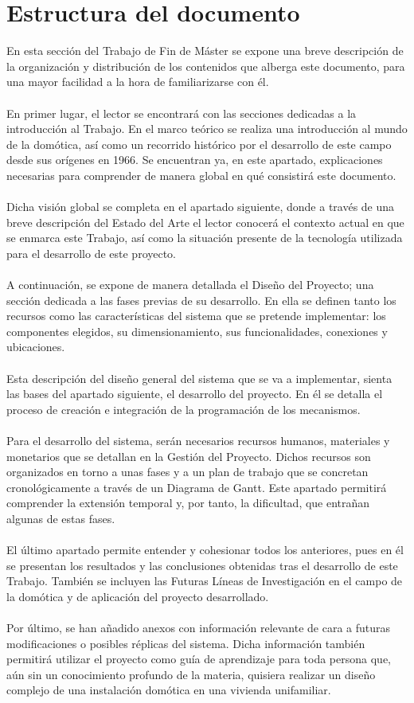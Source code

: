 \section{Estructura del documento}

En esta sección del Trabajo de Fin de Máster se expone una breve descripción de la organización y distribución de los contenidos que alberga este documento, para una mayor facilidad a la hora de familiarizarse con él.\\\\
En primer lugar, el lector se encontrará con las secciones dedicadas a la introducción al Trabajo. En el marco teórico se realiza una introducción al mundo de la domótica, así como un recorrido histórico por el desarrollo de este campo desde sus orígenes en 1966. Se encuentran ya, en este apartado, explicaciones necesarias para comprender de manera global en qué consistirá este documento. \\\\
Dicha visión global se completa en el apartado siguiente, donde a través de una breve descripción del Estado del Arte el lector conocerá el contexto actual en que se enmarca este Trabajo, así como la situación presente de la tecnología utilizada para el desarrollo de este proyecto.\\\\
A continuación, se expone de manera detallada el Diseño del Proyecto; una sección dedicada a las fases previas de su desarrollo. En ella se definen tanto los recursos como las características del sistema que se pretende implementar: los componentes elegidos, su dimensionamiento, sus funcionalidades, conexiones y ubicaciones.\\\\
Esta descripción del diseño general del sistema que se va a implementar, sienta las bases del apartado siguiente, el desarrollo del proyecto. En él se detalla el proceso de creación e integración de la programación de los mecanismos. \\\\
Para el desarrollo del sistema, serán necesarios recursos humanos, materiales y monetarios que se detallan en la Gestión del Proyecto. Dichos recursos son organizados en torno a unas fases y a un plan de trabajo que se concretan cronológicamente a través de un Diagrama de Gantt. Este apartado permitirá comprender la extensión temporal y, por tanto, la dificultad, que entrañan algunas de estas fases.\\\\
El último apartado permite entender y cohesionar todos los anteriores, pues en él se presentan los resultados y las conclusiones obtenidas tras el desarrollo de este Trabajo. También se incluyen las Futuras Líneas de Investigación en el campo de la domótica y de aplicación del proyecto desarrollado.\\\\
Por último, se han añadido anexos con información relevante de cara a futuras modificaciones o posibles réplicas del sistema. Dicha información también permitirá utilizar el proyecto como guía de aprendizaje para toda persona que, aún sin un conocimiento profundo de la materia, quisiera realizar un diseño complejo de una instalación domótica en una vivienda unifamiliar.
